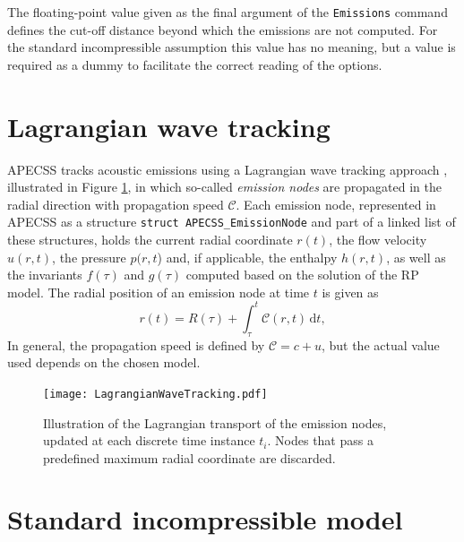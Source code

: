 The floating-point value given as the final argument of the {\tt Emissions} command defines the cut-off distance beyond which the emissions are not computed. For the standard incompressible assumption this value has no meaning, but a value is required as a dummy to facilitate the correct reading of the options.

\section{Lagrangian wave tracking}

APECSS tracks acoustic emissions using a Lagrangian wave tracking approach \citep{Denner2023}, illustrated in Figure \ref{fig:lagrangiantracking}, in which so-called \textit{emission nodes} are propagated in the radial direction with propagation speed $\mathcal{C}$. Each emission node, represented in APECSS as a structure {\tt struct APECSS\_EmissionNode} and part of a linked list of these structures, holds the current radial coordinate $r(t)$, the flow velocity $u(r,t)$, the pressure $p(r,t$) and, if applicable, the enthalpy $h(r,t)$, as well as the invariants $f(\tau)$ and $g(\tau)$ computed based on the solution of the RP model. The radial position of an emission node at time $t$ is given as
\begin{equation}
    r(t) = R(\tau) + \int_\tau^t \mathcal{C}(r,t) \, \mathrm{d}t, 
    \label{eq:r_t}
\end{equation}
In general, the propagation speed is defined by $\mathcal{C}=c+u$, but the actual value used depends on the chosen model.

\begin{figure}
    \begin{center}
    \texttt{[image: LagrangianWaveTracking.pdf]}
    \caption{Illustration of the Lagrangian transport of the emission nodes, updated at each discrete time instance $t_i$. Nodes that pass a predefined maximum radial coordinate are discarded.}
    \label{fig:lagrangiantracking}
    \end{center}
\end{figure}

\section{Standard incompressible model}
\label{sec:emissionsic}

